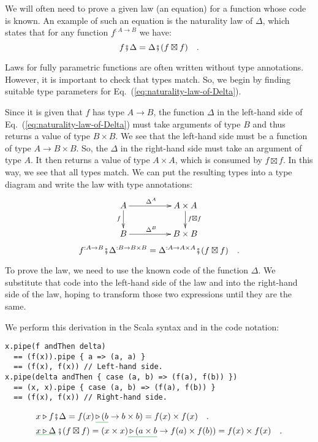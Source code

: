 We will often need to prove a given law (an equation) for a function
whose code is known. An example of such an equation is the naturality
law of $\Delta$, which states that for any function $f^{:A\rightarrow B}$
we have:
\begin{equation}
f\bef\Delta=\Delta\bef(f\boxtimes f)\quad.\label{eq:naturality-law-of-Delta}
\end{equation}

Laws for fully parametric functions are often written without type
annotations. However, it is important to check that types match. So,
we begin by finding suitable type parameters for Eq.~(\ref{eq:naturality-law-of-Delta}).

Since it is given that $f$ has type $A\rightarrow B$, the function
$\Delta$ in the left-hand side of Eq.~(\ref{eq:naturality-law-of-Delta})
must take arguments of type $B$ and thus returns a value of type
$B\times B$. We see that the left-hand side must be a function of
type $A\rightarrow B\times B$. So, the $\Delta$ in the right-hand
side must take an argument of type $A$. It then returns a value of
type $A\times A$, which is consumed by $f\boxtimes f$. In this way,
we see that all types match. We can put the resulting types into a
type diagram and write the law with type annotations:
\[
\xymatrix{\xyScaleY{1.6pc}\xyScaleX{4.0pc}A\ar[d]\sb(0.45){f}\ar[r]\sp(0.45){\Delta^{A}} & A\times A\ar[d]\sp(0.45){f\boxtimes f}\\
B\ar[r]\sp(0.45){\Delta^{B}} & B\times B
}
\]
\[
f^{:A\rightarrow B}\bef\Delta^{:B\rightarrow B\times B}=\Delta^{:A\rightarrow A\times A}\bef(f\boxtimes f)\quad.
\]

\noindent To prove the law, we need to use the known code of the function
$\Delta$. We substitute that code into the left-hand side of the
law and into the right-hand side of the law, hoping to transform those
two expressions until they are the same.

We perform this derivation in the Scala syntax and in the code notation:
\begin{lstlisting}
x.pipe(f andThen delta)
  == (f(x)).pipe { a => (a, a) }
  == (f(x), f(x)) // Left-hand side.
x.pipe(delta andThen { case (a, b) => (f(a), f(b)) })
  == (x, x).pipe { case (a, b) => (f(a), f(b)) }
  == (f(x), f(x)) // Right-hand side.
\end{lstlisting}
\begin{align*}
 & x\triangleright f\bef\Delta=f(x)\,\gunderline{\triangleright\,(b}\rightarrow b\times b)=f(x)\times f(x)\quad.\\
 & \gunderline{x\triangleright\Delta}\,\bef(f\boxtimes f)=(x\times x)\gunderline{\,\triangleright\,(a\times b}\rightarrow f(a)\times f(b))=f(x)\times f(x)\quad.
\end{align*}

